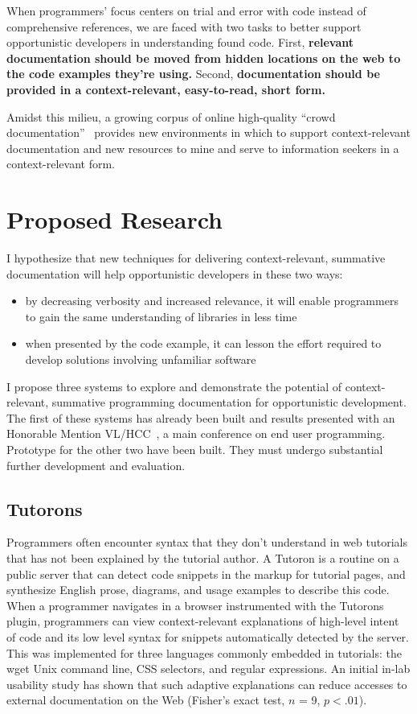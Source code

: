 \documentclass[12pt]{memoir}
\begin{document}
When programmers' focus centers on trial and error with code instead of comprehensive references, we are faced with two tasks to better support opportunistic developers in understanding found code.
First, \textbf{relevant documentation should be moved from hidden locations on the web to the code examples they're using.}
Second, \textbf{documentation should be provided in a context-relevant, easy-to-read, short form.}

Amidst this milieu, a growing corpus of online high-quality ``crowd documentation''~\cite{parnin_crowd_2012} provides new environments in which to support context-relevant documentation and new resources to mine and serve to information seekers in a context-relevant form.

\section{Proposed Research}

I hypothesize that new techniques for delivering context-relevant, summative documentation will help opportunistic developers in these two ways:
\begin{itemize}[noitemsep,topsep=0pt]
\item by decreasing verbosity and increased relevance, it will enable programmers to gain the same understanding of libraries in less time
\item when presented by the code example, it can lesson the effort required to develop solutions involving unfamiliar software
\end{itemize}

I propose three systems to explore and demonstrate the potential of context-relevant, summative programming documentation for opportunistic development.
The first of these systems has already been built and results presented with an Honorable Mention VL/HCC~\cite{head_tutorons_2015}, a main conference on end user programming.
Prototype for the other two have been built.
They must undergo substantial further development and evaluation.

\subsection{Tutorons}
Programmers often encounter syntax that they don't understand in web tutorials that has not been explained by the tutorial author.
A Tutoron is a routine on a public server that can detect code snippets in the markup for tutorial pages, and synthesize English prose, diagrams, and usage examples to describe this code.
When a programmer navigates in a browser instrumented with the Tutorons plugin, programmers can view context-relevant explanations of high-level intent of code and its low level syntax for snippets automatically detected by the server.
This was implemented for three languages commonly embedded in tutorials: the wget Unix command line, CSS selectors, and regular expressions.
An initial in-lab usability study has shown that such adaptive explanations can reduce accesses to external documentation on the Web (Fisher's exact test, $n$ = 9, $p<.01$).
\end{document}
